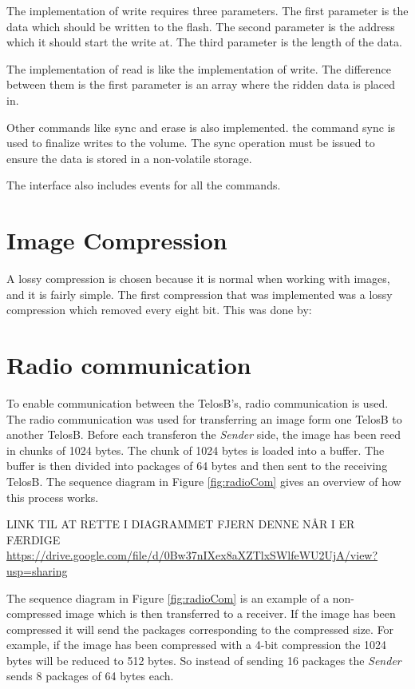 The implementation of write requires three parameters. The first parameter is the data which should be written to the flash. The second parameter is the address which it should start the write at. The third parameter is the length of the data. 

The implementation of read is like the implementation of write. The difference between them is the first parameter is an array where the ridden data is placed in. 

Other commands like sync and erase is also implemented. the command sync is used to finalize writes to the volume. The sync operation must be issued to ensure the data is stored in a non-volatile storage. 

The interface also includes events for all the commands. 

\section{Image Compression}
A lossy compression is chosen because it is normal when working with images, and it is fairly simple. The first compression that was implemented was a lossy compression which removed every eight bit. This was done by:

\section{Radio communication}
To enable communication between the TelosB’s, radio communication is used. The radio communication was used for transferring an image form one TelosB to another TelosB. Before each transferon the \emph{Sender} side, the image has been reed in chunks of 1024 bytes. The chunk of 1024 bytes is loaded into a buffer. The buffer is then divided into packages of 64 bytes and then sent to the receiving TelosB. The sequence diagram in Figure \ref{fig:radioCom} gives an overview of how this process works.

LINK TIL AT RETTE I DIAGRAMMET FJERN DENNE NÅR I ER FÆRDIGE \url{https://drive.google.com/file/d/0Bw37nIXex8aXZTlxSWlfeWU2UjA/view?usp=sharing}


\FloatBarrier

The sequence diagram in Figure \ref{fig:radioCom} is an example of a non-compressed image which is then transferred to a receiver. If the image has been compressed it will send the packages corresponding to the compressed size. For example, if the image has been compressed with a 4-bit compression the 1024 bytes will be reduced to 512 bytes. So instead of sending 16 packages the \emph{Sender} sends 8 packages of 64 bytes each.

